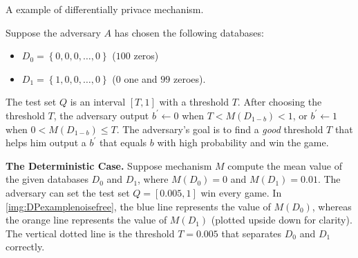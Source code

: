 \begin{protocol}[tbh!]
    \centering
    \caption{A example of differentially privace mechanism.}
    \label{prot:motivationexampleDP}
\end{protocol}
\FloatBarrier

Suppose the adversary $A$ has chosen the following databases:
\begin{itemize}
    \item $D_{0}=\left\{ 0, 0, 0,\ldots ,0\right\} $ ($100$ zeros)
    \item $D_{1}=\left\{ 1, 0, 0,\ldots ,0\right\} $ ($0$ one and $99$ zeroes).
\end{itemize}

The test set $Q$ is an interval $\left[ T,1\right] $ with a threshold $T$. After choosing the threshold $T$, the adversary output $b^{\prime} \gets 0$ when $T<M\left( D_{1-b}\right) < 1$, or $b^{\prime} \gets 1$ when $0<M\left( D_{1-b}\right) \leq T$. The adversary's goal is to find a \textit{good} threshold $T$ that helps him output a $b^{\prime}$ that equals $b$ with high probability and win the game.

\textbf{The Deterministic Case.}
Suppose mechanism $M$ compute the mean value of the given databases $D_0$ and $D_1$, where $M\left( D_{0}\right) =0$ and $M\left( D_{1}\right) =0.01$. The adversary can set the test set $Q =\left[ 0.005,1\right] $ win every game. In \autoref{img:DPexamplenoisefree}, the blue line represents the value of $M\left( D_{0}\right)$, whereas the orange line represents the value of $M\left( D_{1}\right)$ (plotted upside down for clarity). The vertical dotted line is the threshold $T=0.005$ that separates $D_{0}$ and $D_{1}$ correctly.

